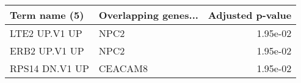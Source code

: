 \begin{tabular}{llr}
\toprule
 Term name (5) & Overlapping genes... &  Adjusted p-value \\
\midrule
 LTE2 UP.V1 UP &                 NPC2 &          1.95e-02 \\
 ERB2 UP.V1 UP &                 NPC2 &          1.95e-02 \\
RPS14 DN.V1 UP &              CEACAM8 &          1.95e-02 \\
\bottomrule
\end{tabular}
